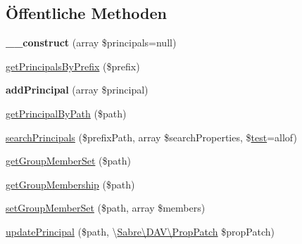 \subsection*{Öffentliche Methoden}
\begin{DoxyCompactItemize}
\item 
\mbox{\label{class_sabre_1_1_d_a_v_a_c_l_1_1_principal_backend_1_1_mock_afc02c96a342aa89f046eef7e401ec03b}} 
{\bfseries \+\_\+\+\_\+construct} (array \$principals=null)
\item 
\mbox{\hyperlink{class_sabre_1_1_d_a_v_a_c_l_1_1_principal_backend_1_1_mock_aac5d118258774c5d15f7fb3f31041fda}{get\+Principals\+By\+Prefix}} (\$prefix)
\item 
\mbox{\label{class_sabre_1_1_d_a_v_a_c_l_1_1_principal_backend_1_1_mock_a703a1389b2b40e9b631af5f9a89a6845}} 
{\bfseries add\+Principal} (array \$principal)
\item 
\mbox{\hyperlink{class_sabre_1_1_d_a_v_a_c_l_1_1_principal_backend_1_1_mock_ad01d09922e344127a51b3379c6b70d5e}{get\+Principal\+By\+Path}} (\$path)
\item 
\mbox{\hyperlink{class_sabre_1_1_d_a_v_a_c_l_1_1_principal_backend_1_1_mock_a570cb9500a7dd4a3f416bfc60dc837d5}{search\+Principals}} (\$prefix\+Path, array \$search\+Properties, \$\mbox{\hyperlink{classtest}{test}}=\textquotesingle{}allof\textquotesingle{})
\item 
\mbox{\hyperlink{class_sabre_1_1_d_a_v_a_c_l_1_1_principal_backend_1_1_mock_aca5c8ecd08f460c7144ec921d35bea0b}{get\+Group\+Member\+Set}} (\$path)
\item 
\mbox{\hyperlink{class_sabre_1_1_d_a_v_a_c_l_1_1_principal_backend_1_1_mock_a1de134b0b7f9c1e2e04bffb7c355a60f}{get\+Group\+Membership}} (\$path)
\item 
\mbox{\hyperlink{class_sabre_1_1_d_a_v_a_c_l_1_1_principal_backend_1_1_mock_abd42943f25499a42e0ed2d23ba0ba143}{set\+Group\+Member\+Set}} (\$path, array \$members)
\item 
\mbox{\hyperlink{class_sabre_1_1_d_a_v_a_c_l_1_1_principal_backend_1_1_mock_ae9c7e20be6c63ec8654edc4681293ab4}{update\+Principal}} (\$path, \textbackslash{}\mbox{\hyperlink{class_sabre_1_1_d_a_v_1_1_prop_patch}{Sabre\textbackslash{}\+D\+A\+V\textbackslash{}\+Prop\+Patch}} \$prop\+Patch)
\end{DoxyCompactItemize}

